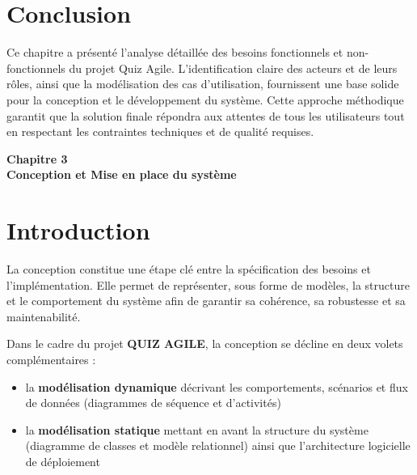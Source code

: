 \documentclass[12pt,a4paper]{report}
\begin{document}
\section{Conclusion}

Ce chapitre a présenté l'analyse détaillée des besoins fonctionnels et non-fonctionnels du projet Quiz Agile. L'identification claire des acteurs et de leurs rôles, ainsi que la modélisation des cas d'utilisation, fournissent une base solide pour la conception et le développement du système. Cette approche méthodique garantit que la solution finale répondra aux attentes de tous les utilisateurs tout en respectant les contraintes techniques et de qualité requises.


\cleardoublepage
\thispagestyle{empty}
\begin{center}
    \vspace*{4cm}
    {\Huge \textbf{Chapitre 3}}\\[1.5cm]
    {\LARGE \textbf{Conception et Mise en place du système}}
\end{center}
\cleardoublepage

\setcounter{section}{0}

\section{Introduction}

La conception constitue une étape clé entre la spécification des besoins et l'implémentation. Elle permet de représenter, sous forme de modèles, la structure et le comportement du système afin de garantir sa cohérence, sa robustesse et sa maintenabilité.

Dans le cadre du projet \textbf{QUIZ AGILE}, la conception se décline en deux volets complémentaires :
\begin{itemize}
    \item la \textbf{modélisation dynamique} décrivant les comportements, scénarios et flux de données (diagrammes de séquence et d'activités)
    \item la \textbf{modélisation statique} mettant en avant la structure du système (diagramme de classes et modèle relationnel) ainsi que l'architecture logicielle de déploiement
\end{itemize}
\end{document}
